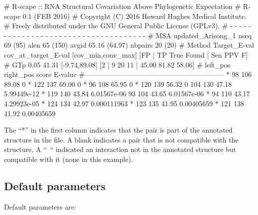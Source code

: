 \begin{sreoutput}
# R-scape :: RNA Structural Covariation Above Phylogenetic Expectation
# R-scape 0.1 (FEB 2016)
# Copyright (C) 2016 Howard Hughes Medical Institute.
# Freely distributed under the GNU General Public License (GPLv3).
# - - - - - - - - - - - - - - - - - - - - - - - - - - - - - - - - - - - -
# MSA updated_Arisong_1 nseq 69 (95) alen 65 (150) avgid 65.16 (64.97) nbpairs 20 (20)
# Method Target_E-val cov_at_target_E-val [cov_min,conv_max] [FP | TP True Found | Sen PPV F] 
# GTp    0.05         41.31               [-9.74,89.08]      [2 | 9 20 11 | 45.00 81.82 58.06] 
#       left_pos       right_pos        score   E-value
#------------------------------------------------------------
*	      98	     106	89.08	0
*	     122	     137	69.00	0
*	      96	     108	65.95	0
*	     120	     139	56.32	0
 	     104	     130	47.18	5.99449e-12
*	     119	     140	43.84	6.01567e-06
 	      93	     104	43.65	6.01567e-06
*	      94	     110	43.17	4.29923e-05
*	     124	     134	42.97	0.000111963
*	     123	     135	41.95	0.00405659
*	     121	     138	41.92	0.00405659
\end{sreoutput}
The ``*'' in the first column indicates that the pair is part of the
annotated structure in the  file. A blank
indicates a pair that is not compatible with the structure. A ``~``
indicated an interaction not in the annotated structure but compatible
with it (none in this example).

\subsection{Default parameters}

Default parameters are:

